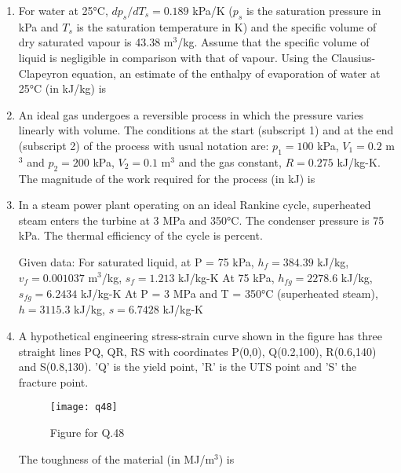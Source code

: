\documentclass[journal,11pt,onecolumn]{IEEEtran}
\begin{document}
\begin{enumerate}[resume]
    \item For water at 25°C, $dp_{s}/dT_{s} = 0.189$ kPa/K ($p_{s}$ is the saturation pressure in kPa and $T_{s}$ is the saturation temperature in K) and the specific volume of dry saturated vapour is 43.38 m$^3$/kg. Assume that the specific volume of liquid is negligible in comparison with that of vapour. Using the Clausius-Clapeyron equation, an estimate of the enthalpy of evaporation of water at 25°C (in kJ/kg) is \underline{\hspace{2cm}}

    \item An ideal gas undergoes a reversible process in which the pressure varies linearly with volume. The conditions at the start (subscript 1) and at the end (subscript 2) of the process with usual notation are: $p_1 = 100$ kPa, $V_1 = 0.2$ m$^3$ and $p_2 = 200$ kPa, $V_2 = 0.1$ m$^3$ and the gas constant, $R = 0.275$ kJ/kg-K. The magnitude of the work required for the process (in kJ) is \underline{\hspace{2cm}}

    \item In a steam power plant operating on an ideal Rankine cycle, superheated steam enters the turbine at 3 MPa and 350°C. The condenser pressure is 75 kPa. The thermal efficiency of the cycle is \underline{\hspace{2cm}} percent.

          Given data:
          For saturated liquid, at P = 75 kPa,
          $h_f = 384.39$ kJ/kg, $v_f = 0.001037$ m$^3$/kg, $s_f = 1.213$ kJ/kg-K
          At 75 kPa, $h_{fg} = 2278.6$ kJ/kg, $s_{fg} = 6.2434$ kJ/kg-K
          At P = 3 MPa and T = 350°C (superheated steam),
          $h = 3115.3$ kJ/kg, $s = 6.7428$ kJ/kg-K

    \item A hypothetical engineering stress-strain curve shown in the figure has three straight lines PQ, QR, RS with coordinates P(0,0), Q(0.2,100), R(0.6,140) and S(0.8,130). 'Q' is the yield point, 'R' is the UTS point and 'S' the fracture point.

          \begin{figure}[H]
              \centering
              \texttt{[image: q48]}
              \caption{Figure for Q.48}
              \label{q48}
          \end{figure}

          The toughness of the material (in MJ/m$^3$) is \underline{\hspace{2cm}}


\end{enumerate}
\end{document}
